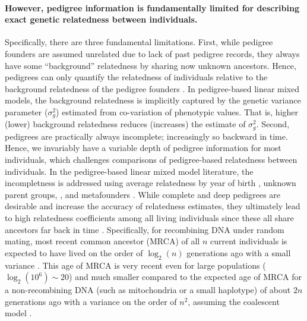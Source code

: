 \paragraph{However, pedigree information is fundamentally limited for
describing exact genetic relatedness between individuals.}
%
Specifically, there are three fundamental limitations.
%
First, while pedigree founders are assumed unrelated due to lack of
past pedigree records, they always have some ``background''
relatedness by sharing now unknown ancestors.
%
Hence, pedigrees can only quantify the relatedness of individuals relative
to the background relatedness of the pedigree founders
\citep{wright1965interpretation, jacquard1975inbreeding, kennedy1988genetic,
powell2010reconciling, legarra2015ancestral, legarra2016comparing}.
%
In pedigree-based linear mixed models, the background relatedness is
implicitly captured by the genetic variance parameter ($\sigma_g^2$)
estimated from co-variation of phenotypic values.
%
That is, higher (lower) background relatedness reduces (increases) the
estimate of $\sigma_g^2$.
%
Second, pedigrees are practically always incomplete; increasingly so
backward in time.
%
Hence, we invariably have a variable depth of pedigree information for
most individuals, which challenges comparisons of pedigree-based
relatedness between individuals.
%
In the pedigree-based linear mixed model literature, the incompletness is
addressed using 
average relatedness by year of birth
\citep{vanraden1992accounting, aguilar2008recursive},
unknown parent groups,
\citep{thompson1979sire, quaas1988additive, muff2019animal},
and metafounders
\citep{legarra2015ancestral, garciabaccino2017metafounders}.
%
While complete and deep pedigrees are desirable and increase the accuracy
of relatedness estimates, they ultimately lead to high relatedness
coefficients among all living individuals since these all share ancestors
far back in time
\citep{jacquard1974genetic, jacquard1975inbreeding}.
%
Specifically, for recombining DNA under random mating, most recent common
ancestor (MRCA) of all $n$ current individuals is expected to have lived
on the order of $\log_2(n)$ generations ago with a small variance
\citep{chang1999recent, derida2000on}.
%
This age of MRCA is very recent even for large populations
($\log_2(10^6) \sim 20$) and much smaller compared to the expected age of
MRCA for a non-recombining DNA (such as mitochondria or a small haplotype)
of about $2n$ generations ago with a variance on the order of $n^2$,
assuming the coalescent model \citep{kingman1982on, chang1999recent, hein2004gene}.
